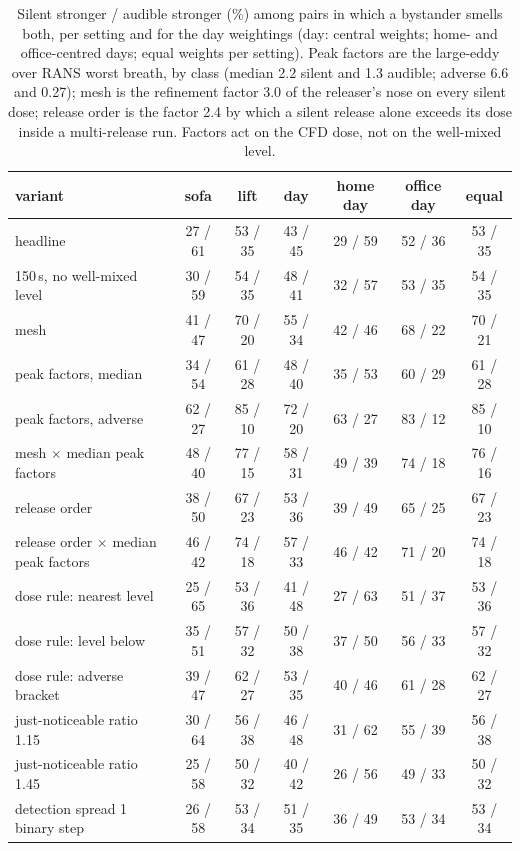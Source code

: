 \documentclass[11pt]{article}
\begin{document}
\begin{table}
\caption{Silent stronger / audible stronger (\%) among pairs in which a bystander smells both, per setting and for
the day weightings (day: central weights; home- and office-centred days; equal weights per setting). Peak factors
are the large-eddy over RANS worst breath, by class (median 2.2 silent and 1.3 audible; adverse 6.6 and 0.27); mesh
is the refinement factor 3.0 of the releaser's nose on every silent dose; release order is the factor 2.4 by which a
silent release alone exceeds its dose inside a multi-release run. Factors act on the CFD dose, not on the
well-mixed level.}
\label{tab:combined}
\small
\setlength{\tabcolsep}{3.5pt}
\begin{tabular}{lcccccc}
\toprule
variant & sofa & lift & day & home day & office day & equal \\
\midrule
headline & 27 / 61 & 53 / 35 & 43 / 45 & 29 / 59 & 52 / 36 & 53 / 35 \\
150\,s, no well-mixed level & 30 / 59 & 54 / 35 & 48 / 41 & 32 / 57 & 53 / 35 & 54 / 35 \\
mesh & 41 / 47 & 70 / 20 & 55 / 34 & 42 / 46 & 68 / 22 & 70 / 21 \\
peak factors, median & 34 / 54 & 61 / 28 & 48 / 40 & 35 / 53 & 60 / 29 & 61 / 28 \\
peak factors, adverse & 62 / 27 & 85 / 10 & 72 / 20 & 63 / 27 & 83 / 12 & 85 / 10 \\
mesh $\times$ median peak factors & 48 / 40 & 77 / 15 & 58 / 31 & 49 / 39 & 74 / 18 & 76 / 16 \\
release order & 38 / 50 & 67 / 23 & 53 / 36 & 39 / 49 & 65 / 25 & 67 / 23 \\
release order $\times$ median peak factors & 46 / 42 & 74 / 18 & 57 / 33 & 46 / 42 & 71 / 20 & 74 / 18 \\
dose rule: nearest level & 25 / 65 & 53 / 36 & 41 / 48 & 27 / 63 & 51 / 37 & 53 / 36 \\
dose rule: level below & 35 / 51 & 57 / 32 & 50 / 38 & 37 / 50 & 56 / 33 & 57 / 32 \\
dose rule: adverse bracket & 39 / 47 & 62 / 27 & 53 / 35 & 40 / 46 & 61 / 28 & 62 / 27 \\
just-noticeable ratio 1.15 & 30 / 64 & 56 / 38 & 46 / 48 & 31 / 62 & 55 / 39 & 56 / 38 \\
just-noticeable ratio 1.45 & 25 / 58 & 50 / 32 & 40 / 42 & 26 / 56 & 49 / 33 & 50 / 32 \\
detection spread 1 binary step & 26 / 58 & 53 / 34 & 51 / 35 & 36 / 49 & 53 / 34 & 53 / 34 \\

\end{tabular}
\end{table}
\end{document}
